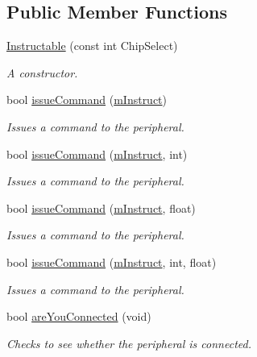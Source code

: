 \subsection*{Public Member Functions}
\begin{DoxyCompactItemize}
\item 
\mbox{\hyperlink{class_instructable_a688587b062ae8f3979bf7567041b86c1}{Instructable}} (const int Chip\+Select)
\begin{DoxyCompactList}\small\item\em A constructor. \end{DoxyCompactList}\item 
bool \mbox{\hyperlink{class_instructable_a26afb4fb25fe8a13e268544d0850fe3f}{issue\+Command}} (\mbox{\hyperlink{_s_p_i___instruction_set_8h_afefab269eb3692ecb3e5fcdbb9440792}{m\+Instruct}})
\begin{DoxyCompactList}\small\item\em Issues a command to the peripheral. \end{DoxyCompactList}\item 
bool \mbox{\hyperlink{class_instructable_ae1de225deda4decc52ce8e06efa8c547}{issue\+Command}} (\mbox{\hyperlink{_s_p_i___instruction_set_8h_afefab269eb3692ecb3e5fcdbb9440792}{m\+Instruct}}, int)
\begin{DoxyCompactList}\small\item\em Issues a command to the peripheral. \end{DoxyCompactList}\item 
bool \mbox{\hyperlink{class_instructable_a556e6313ec5ac21a30efe8a5ef28a486}{issue\+Command}} (\mbox{\hyperlink{_s_p_i___instruction_set_8h_afefab269eb3692ecb3e5fcdbb9440792}{m\+Instruct}}, float)
\begin{DoxyCompactList}\small\item\em Issues a command to the peripheral. \end{DoxyCompactList}\item 
bool \mbox{\hyperlink{class_instructable_ac2d69c105880162fed7b7be07228cfa7}{issue\+Command}} (\mbox{\hyperlink{_s_p_i___instruction_set_8h_afefab269eb3692ecb3e5fcdbb9440792}{m\+Instruct}}, int, float)
\begin{DoxyCompactList}\small\item\em Issues a command to the peripheral. \end{DoxyCompactList}\item 
bool \mbox{\hyperlink{class_instructable_a2bdcc11cead0067e963c524968d0d3e1}{are\+You\+Connected}} (void)
\begin{DoxyCompactList}\small\item\em Checks to see whether the peripheral is connected. \end{DoxyCompactList}\end{DoxyCompactItemize}


